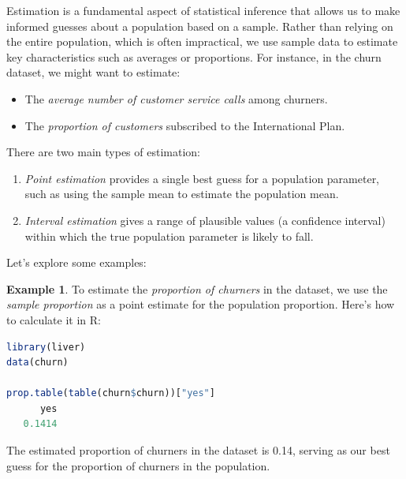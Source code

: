 \documentclass[
]{book}
\providecommand{\tightlist}{%
  \setlength{\itemsep}{0pt}\setlength{\parskip}{0pt}}
\theoremstyle{definition}
\theoremstyle{definition}
\newtheorem{example}{Example}[chapter]
\theoremstyle{definition}
\theoremstyle{definition}
\theoremstyle{remark}
\begin{document}
Estimation is a fundamental aspect of statistical inference that allows us to make informed guesses about a population based on a sample. Rather than relying on the entire population, which is often impractical, we use sample data to estimate key characteristics such as averages or proportions. For instance, in the churn dataset, we might want to estimate:

\begin{itemize}
\tightlist
\item
  The \emph{average number of customer service calls} among churners.\\
\item
  The \emph{proportion of customers} subscribed to the International Plan.
\end{itemize}

There are two main types of estimation:

\begin{enumerate}
\def\labelenumi{\arabic{enumi}.}
\tightlist
\item
  \emph{Point estimation} provides a single best guess for a population parameter, such as using the sample mean to estimate the population mean.\\
\item
  \emph{Interval estimation} gives a range of plausible values (a confidence interval) within which the true population parameter is likely to fall.
\end{enumerate}

Let's explore some examples:

\begin{example}
\protect\hypertarget{exm:ex-est-churn-proportion}{}\label{exm:ex-est-churn-proportion}To estimate the \emph{proportion of churners} in the dataset, we use the \emph{sample proportion} as a point estimate for the population proportion. Here's how to calculate it in R:

\begin{lstlisting}[language=R]
library(liver)
data(churn) 

prop.table(table(churn$churn))["yes"]
      yes 
   0.1414
\end{lstlisting}

The estimated proportion of churners in the dataset is 0.14, serving as our best guess for the proportion of churners in the population.
\end{example}
\end{document}
